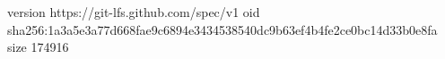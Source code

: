 version https://git-lfs.github.com/spec/v1
oid sha256:1a3a5e3a77d668fae9c6894e3434538540dc9b63ef4b4fe2ce0bc14d33b0e8fa
size 174916
